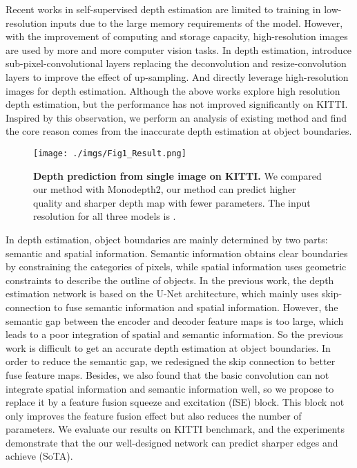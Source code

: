 \documentclass[letterpaper]{article} \usepackage{aaai21}  \usepackage{times}  \usepackage{helvet} \usepackage{courier}  \usepackage[hyphens]{url}  \usepackage{graphicx} \urlstyle{rm} \def\UrlFont{\rm}  \usepackage{natbib}  \usepackage{caption} \frenchspacing  \setlength{\pdfpagewidth}{8.5in}  \setlength{\pdfpageheight}{11in}  \usepackage{booktabs}
\begin{document}
Recent works \citep{zhou2017unsupervised, godard2017unsupervised} in self-supervised depth estimation are limited to training in low-resolution inputs due to the large memory
requirements of the model. However, with the improvement of computing and storage capacity, high-resolution images are used by more and more computer vision tasks. In depth
estimation, \cite{superdepth} introduce sub-pixel-convolutional \cite{shi2016real-time} layers replacing the deconvolution and resize-convolution layers to improve the effect of up-sampling. And 
\cite{godard2019digging} directly leverage high-resolution images for depth estimation. Although the above works explore high resolution depth estimation, but the performance 
has not improved significantly on KITTI. Inspired by this observation, we perform an analysis of existing method and find the core reason comes from the inaccurate depth 
estimation at object boundaries. 

\begin{figure}[t]
    \centering
    \texttt{[image: ./imgs/Fig1\_Result.png]} 
    \caption{\textbf{Depth prediction from single image on KITTI.} We compared our method with Monodepth2\cite{godard2019digging}, our method can 
    predict higher quality and sharper depth map with fewer parameters. The input resolution for all three models is .}
\label{fig1}
\end{figure}

In depth estimation, object boundaries are mainly determined by two parts: semantic and spatial information. Semantic information obtains clear boundaries by constraining the 
categories of pixels, while spatial information uses geometric constraints to describe the outline of objects. In the previous work, the depth estimation network is based on
the U-Net\cite{ronneberger2015u} architecture, which mainly uses skip-connection to fuse semantic information and spatial information. However, the semantic gap between the encoder and decoder feature
maps is too large, which leads to a poor integration of spatial and semantic information. So the previous work is difficult to get an accurate depth estimation at object boundaries.
In order to reduce the semantic gap, we redesigned the skip connection to better fuse feature maps. Besides, we also found that the basic convolution can not integrate
spatial information and semantic information well, so we propose to replace it by a feature fusion squeeze and excitation (fSE) block. This block not only improves the feature 
fusion effect but also reduces the number of parameters. We evaluate our results on KITTI benchmark, and the experiments demonstrate that the our well-designed network can predict 
sharper edges and achieve (SoTA). 
\end{document}
